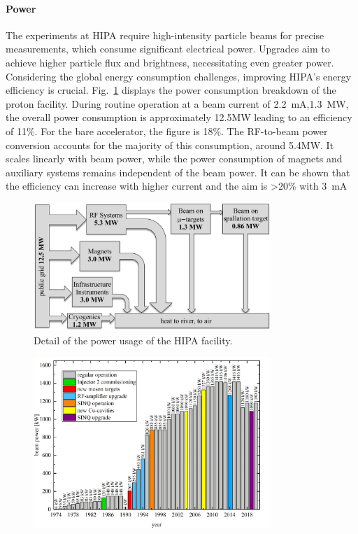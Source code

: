 \begin{refsection}
        \paragraph{Power} The experiments at HIPA require high-intensity particle beams for precise measurements, which consume significant electrical power. 
        Upgrades aim to achieve higher particle flux and brightness, necessitating even greater power. 
        Considering the global energy consumption challenges, improving HIPA's energy efficiency is crucial. 
        Fig.~\ref{fig:PSI:HIPA:consumption} displays the power consumption breakdown of the proton facility. 
        During routine operation at a beam current of \SI{2.2}{mA},\SI{1.3}{MW}, the overall power consumption is approximately 12.5MW leading to an efficiency of 11\%.
        For the bare accelerator, the figure is 18\%.
        The RF-to-beam power conversion accounts for the majority of this consumption, around 5.4MW. 
        It scales linearly with beam power, while the power consumption of magnets and auxiliary systems remains independent of the beam power.
        It can be shown that the efficiency can increase with higher current and the aim is >20\% with \SI{3}{mA}
        \begin{figure}
            \centering
            \includegraphics[width = 0.8\textwidth]{Figures/Introduction/PSI_HIPA_consumption.png}
            \caption{Detail of the power usage of the HIPA facility.}
            \label{fig:PSI:HIPA:consumption}
        \end{figure}
        \begin{figure}
            \centering
            \includegraphics[width = 0.8\textwidth]{Figures/Introduction/PSI_HIPA_power.png}

\end{figure}
\end{refsection}
